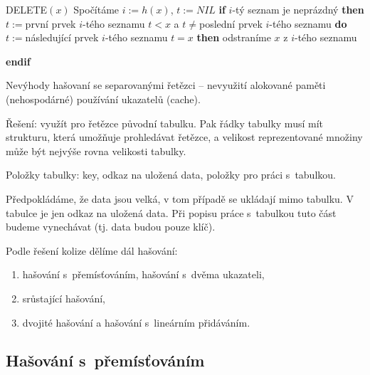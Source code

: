 \documentclass[a4paper,12pt]{article}
\begin{document}
{{DELETE$(x)$}\newline 
Spočítáme $i:=h(x)$, $t:=NIL$\newline
{\bf \textsf{if}} $i$-tý seznam je neprázdný {\bf \textsf{then}\newline 
\phantom{{\rm ---}}$t:=$}první prvek $i$-tého seznamu\newline 
{} $t<x$ a $t\ne$poslední prvek $i$-tého seznamu {\bf \textsf{do}}\newline 
\phantom{------}$t:=$následující prvek $i$-tého seznamu\newline 
{} $t=x$ {\bf \textsf{then}} odstraníme $x$ z $i$-tého seznamu {\bf \textsf{endif}

}

}
    
Nevýhody hašovaní se separovanými řetězci --\newline 
\phantom{---}nevyužití alokované paměti (nehospodárné)\newline 
\phantom{---}používání ukazatelů (cache).\newline 

Řešení: využít pro řetězce původní tabulku. Pak řádky tabulky musí mít strukturu, která umožňuje prohledávat řetězce, a velikost reprezentované množiny 
může být nejvýše rovna velikosti tabulky.  

Položky tabulky:\newline 
\phantom{---}key,\newline 
\phantom{---}odkaz na uložená data,\newline 
\phantom{---}položky pro práci s~tabulkou.

Předpokládáme, že data jsou velká, v tom případě se 
ukládají mimo tabulku. V tabulce je jen odkaz na uložená data. 
Při popisu práce s~tabulkou tuto část budeme vynechávat (tj. 
data budou pouze klíč).

Podle řešení kolize dělíme dál hašování:
\begin{enumerate}
\item 
hašování s~přemísťováním, hašování s~dvěma 
ukazateli, 
\item 
srůstající hašování,
\item 
dvojité hašování a hašování s~lineárním 
přidáváním.
\end{enumerate}

\subsection{Hašování s~přemísťováním}
\end{document}
